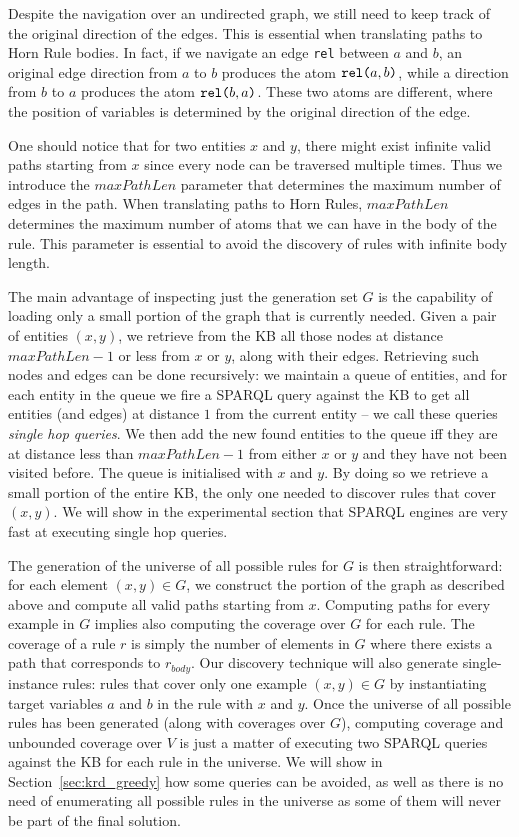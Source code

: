 Despite the navigation over an undirected graph, we still need to keep track of the original direction of the edges. This is essential when translating paths to Horn Rule bodies. In fact, if we navigate an edge \texttt{rel} between $a$ and $b$, an original edge direction from $a$ to $b$ produces the atom $\texttt{rel(}a,b\texttt{)}$, while a direction from $b$ to $a$ produces the atom $\texttt{rel(}b,a\texttt{)}$. These two atoms are different, where the position of variables is determined by the original direction of the edge.

One should notice that for two entities $x$ and $y$, there might exist infinite valid paths starting from $x$ since every node can be traversed multiple times. Thus we introduce the $maxPathLen$ parameter that determines the maximum number of edges in the path. When translating paths to Horn Rules, $maxPathLen$ determines the maximum number of atoms that we can have in the body of the rule. This parameter is essential to avoid the discovery of rules with infinite body length.

The main advantage of inspecting just the generation set $G$ is the capability of loading only a small portion of the graph that is currently needed. Given a pair of entities $(x,y)$, we retrieve from the  KB all those nodes at distance $maxPathLen-1$ or less from $x$ or $y$, along with their edges. Retrieving such nodes and edges can be done recursively: we maintain a queue of entities, and for each entity in the queue we fire a SPARQL query against the KB to get all entities (and edges) at distance $1$ from the current entity -- we call these queries \emph{single hop queries}. We then add the new found entities to the queue iff they are at distance less than  $maxPathLen-1$ from either $x$ or $y$ and they have not been visited before. The queue is initialised with $x$ and $y$. By doing so we retrieve a small portion of the entire KB, the only one needed to discover rules that cover $(x,y)$. We will show in the experimental section that SPARQL engines are very fast at executing single hop queries.

The generation of the universe of all possible rules for $G$ is then straightforward: for each element $(x,y) \in G$, we construct the portion of the graph as described above and compute all valid paths starting from $x$. Computing paths for every example in $G$ implies also computing the coverage over $G$ for each rule. The coverage of a rule $r$ is simply the number of elements in $G$ where there exists a path that corresponds to $r_{body}$. Our discovery technique will also generate single-instance rules: rules that cover only one example $(x,y) \in G$ by instantiating target variables $a$ and $b$ in the rule with $x$ and $y$. Once the universe of all possible rules has been generated (along with coverages over $G$), computing coverage and unbounded coverage over $V$ is just a matter of executing two SPARQL queries against the KB for each rule in the universe. 
We will show in Section~\ref{sec:krd_greedy} how some queries can be avoided, as well as there is no need of enumerating all possible rules in the universe as some of them will never be part of the final solution.

